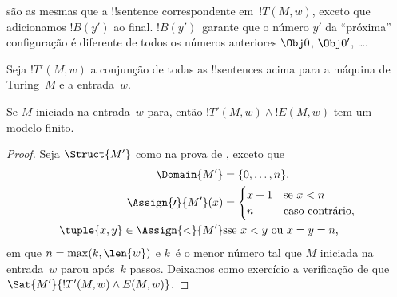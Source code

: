 \documentclass[../../../include/open-logic-section]{subfiles}
\begin{document}
\begin{enumerate}
são as mesmas que a !!{sentence} correspondente
em~$!T(M,w)$, exceto que adicionamos $!B(y')$ ao final. $!B(y')$~garante
que o número $y'$ da ``próxima'' configuração é diferente de
todos os números anteriores $\Obj 0$, $\Obj 0'$, \dots.
\end{enumerate}
Seja $!T'(M, w)$ a conjunção de todas as !!{sentence}s acima para a
máquina de Turing~$M$ e a entrada~$w$.

\begin{lem}
  Se $M$ iniciada na entrada~$w$ para, então $!T'(M,w) \land !E(M,w)$
  tem um modelo finito.
\end{lem}

\begin{proof}
  Seja $\Struct{M'}$ como na prova de
  , exceto que
  \begin{align*}
    \Domain{M'} & = \{0, \dots, n\},\\
    \Assign{\prime}{M'}(x) & = 
    \begin{cases}
      x + 1 &\text{se $x < n$}\\
      n &\text{caso contrário,}
    \end{cases} \\
    \tuple{x,y} \in \Assign{<}{M'} &\text{sse $x < y$ ou $x = y = n$,}
  \end{align*}
  em que $n = \max(k,\len{w})$ e $k$~é o menor número tal que
  $M$ iniciada na entrada~$w$ parou após~$k$ passos. Deixamos como
  exercício a verificação de que $\Sat{M'}{!T'(M,w) \land E(M,w)}$.
\end{proof}
\end{document}
